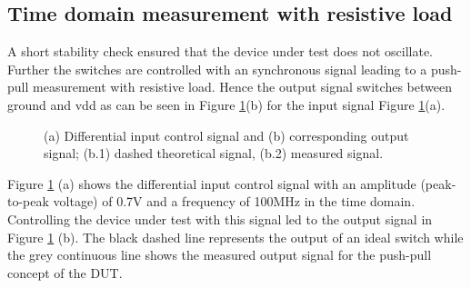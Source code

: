 \documentclass[journal]{IEEEtran}
\begin{document}
\subsection{Time domain measurement with resistive load}
A short stability check ensured that the device under test does not oscillate.
Further the switches are controlled with an synchronous signal leading to a push-pull measurement with resistive load.
Hence the output signal switches between ground and vdd as can be seen in Figure \ref{fig:meas_Input_Output_RLoad_100M_SmallSize_Paper}(b) for the input signal Figure \ref{fig:meas_Input_Output_RLoad_100M_SmallSize_Paper}(a).



\begin{figure}[htb]
  \centering
	\begin{scriptsize}
  	\def\svgwidth{\columnwidth}
 	 
  	\caption{(a) Differential input control signal and (b) corresponding output signal; (b.1) dashed theoretical signal, (b.2) measured signal.}
  	\label{fig:meas_Input_Output_RLoad_100M_SmallSize_Paper}
	\end{scriptsize}
\end{figure}


Figure \ref{fig:meas_Input_Output_RLoad_100M_SmallSize_Paper} (a) shows the differential input control signal with an amplitude (peak-to-peak voltage) of 0.7V and a frequency of 100MHz in the time domain.
Controlling the device under test with this signal led to the output signal in Figure \ref{fig:meas_Input_Output_RLoad_100M_SmallSize_Paper} (b).
The black dashed line represents the output of an ideal switch while the grey continuous line shows the measured output signal for the push-pull concept of the DUT.
\end{document}
